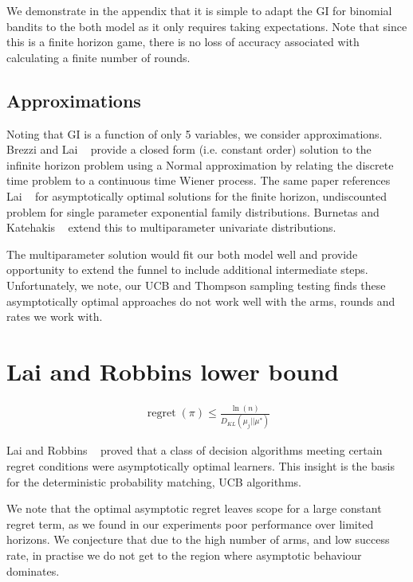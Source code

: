 \documentclass[11pt,a4,singlespacing,titlepagenumber=on]{scrreprt}
\numberwithin{equation}{chapter} %
\theoremstyle{remark}
\begin{document}
We demonstrate in the appendix that it is simple to adapt the GI for binomial bandits to the both model as it only requires taking expectations. Note that since this is a finite horizon game, there is no loss of accuracy associated with calculating a finite number of rounds.

\subsection{ Approximations }

Noting that GI is a function of only 5 variables, we consider approximations. Brezzi and Lai ~\cite{brezzi2002optimal} provide a closed form (i.e. constant order) solution to the infinite horizon problem using a Normal approximation by relating the discrete time problem to a continuous time Wiener process.  The same paper references Lai ~\cite{lai1987adaptive} for asymptotically optimal solutions for the finite horizon, undiscounted problem for single parameter exponential family distributions. Burnetas and Katehakis ~\cite{burnetas1996optimal} extend this to multiparameter univariate distributions.

The multiparameter solution would fit our both model well and provide opportunity to extend the funnel to include additional intermediate steps. Unfortunately, we note, our UCB and Thompson sampling testing finds these asymptotically optimal approaches do not work well with the arms, rounds and rates we work with.

\section{ Lai and Robbins lower bound }

\begin{align}
\operatorname{regret}(\pi)  \leq  \frac{\ln(n)}{D_{KL}(\mu_j||\mu^{*})} %
\end{align}

Lai and Robbins ~\cite{lai1985asymptotically} proved that a class of decision algorithms meeting certain regret conditions were asymptotically optimal learners. This insight is the basis for the deterministic probability matching, UCB algorithms. 


We note that the optimal asymptotic regret leaves scope for a large constant regret term, as we found in our experiments poor performance over limited horizons. We conjecture that due to the high number of arms, and low success rate, in practise we do not get to the region where asymptotic behaviour dominates.
\end{document}

